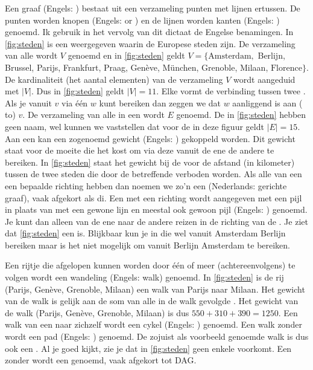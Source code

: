 Een graaf (Engels: ) bestaat uit een verzameling punten met lijnen ertussen.
De punten worden knopen (Engels:  or ) en de lijnen worden kanten (Engels: ) genoemd.
Ik gebruik in het vervolg van dit dictaat de Engelse benamingen.
In \cref{fig:steden} is een  weergegeven waarin de  Europese steden zijn.
De verzameling van alle  wordt $V$ genoemd en in \cref{fig:steden} geldt $V = \{\text{Amsterdam},$ Berlijn, Brussel, Parijs, Frankfurt, Praag, Genève, München, Grenoble, Milaan, $\text{Florence}\}$.
De kardinaliteit (het aantal elementen) van de verzameling $V$ wordt aangeduid met $|V|$.
Dus in \cref{fig:steden} geldt $|V|=11$.
Elke  vormt de verbinding tussen twee .
Als je vanuit  $v$ via één   $w$ kunt bereiken dan zeggen we dat $w$ aanliggend is aan ( to) $v$.
De verzameling van alle  in een  wordt $E$ genoemd.
De  in \cref{fig:steden} hebben geen naam, wel kunnen we vaststellen dat voor de  in deze figuur geldt $|E|=15$.
Aan een  kan een zogenoemd gewicht (Engels: ) gekoppeld worden.
Dit gewicht staat voor de moeite die het kost om via deze  vanuit de ene  de andere  te bereiken.
In \cref{fig:steden} staat het gewicht bij de  voor de afstand (in kilometer) tussen de twee steden die door de betreffende  verboden worden.
Als alle  van een  een bepaalde richting hebben dan noemen we zo'n  een  (Nederlands: gerichte graaf), vaak afgekort als di.
Een  met een richting wordt aangegeven met een pijl in plaats van met een gewone lijn en meestal ook gewoon pijl (Engels: ) genoemd.
Je kunt dan alleen van de ene naar de andere  reizen in de richting van de .
Je ziet dat \cref{fig:steden} een   is.
Blijkbaar kun je in die  wel vanuit Amsterdam Berlijn bereiken maar is het niet mogelijk om vanuit Berlijn Amsterdam te bereiken.

Een rijtje  die afgelopen kunnen worden door één of meer  (achtereenvolgens) te volgen wordt een wandeling (Engels: walk) genoemd.
In \cref{fig:steden} is de rij  (Parijs, Genève, Grenoble, Milaan) een walk van Parijs naar Milaan.
Het gewicht van de walk is gelijk aan de som van alle in de walk gevolgde .
Het gewicht van de walk (Parijs, Genève, Grenoble, Milaan) is dus $550 + 310 + 390 = 1250$.
Een walk van een  naar zichzelf wordt een cykel (Engels: ) genoemd.
Een walk zonder  wordt een pad (Engels: ) genoemd.
De zojuist als voorbeeld genoemde walk is dus ook een .
Al je goed kijkt, zie je dat in \cref{fig:steden} geen enkele  voorkomt.
Een   zonder  wordt een  genoemd, vaak afgekort tot DAG.

